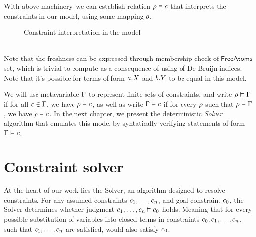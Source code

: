 \documentclass[english, mgr]{iithesis}
\renewcommand{\it}[1]{\textit{#1}}
\begin{document}
With above machinery, we can establish relation $\rho \vDash c$
that interprets the constraints in our model, using some mapping $\rho$.
\begin{figure}[htbp]
  \centering
  \caption{Constraint interpretation in the model}
  \label{fig:constraint-interpretation}
\end{figure}
\\
Note that the freshness can be expressed through membership check of $\mathsf{FreeAtoms}$ set,
which is trivial to compute as a consequence of using of De Bruijn indices.
Note that  it's possible for terms of form $a.{X}$ and $b.{Y}$
to be equal in this model.

We will use metavariable $\Gamma$ to represent finite sets of constraints,
and write $\rho \vDash \Gamma$ if for all $c \in \Gamma$,
we have $\rho \vDash c$,
as well as write $\Gamma \vDash c$ if for every $\rho$ such that $\rho \vDash \Gamma$,
we have $\rho \vDash c$.
In the next chapter, we present the deterministic \it{Solver} algorithm
that emulates this model by syntatically verifying statements of form $\Gamma \vDash c$.

\chapter{Constraint solver} \label{sec:solver}
At the heart of our work lies the Solver, an algorithm designed to resolve constraints.
For any assumed constraints $c_1, \dots, c_n$, and
goal constraint $c_0$, the Solver determines whether judgment $c_1, \dots, c_n \vDash c_0$ holds.
Meaning that for every possible substitution of variables into closed terms in constraints $c_0, c_1, \dots, c_n$,
such that $c_1, \dots, c_n$ are satisfied, would also satisfy $c_0$.
\end{document}
